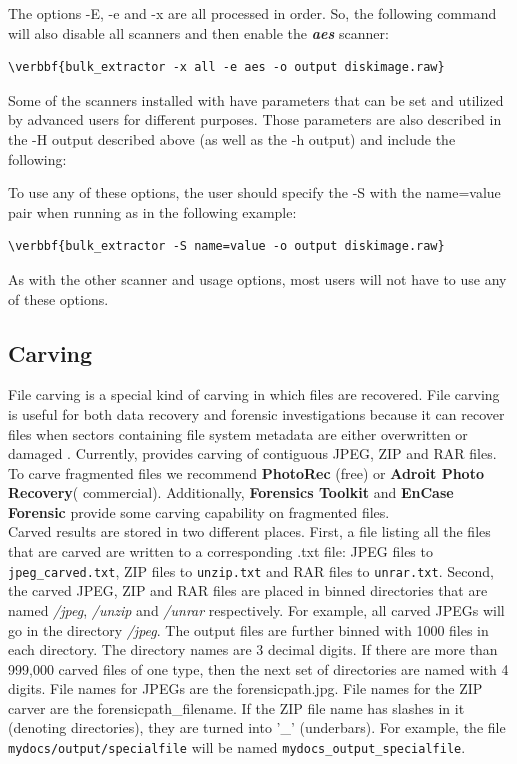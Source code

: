 \documentclass[11pt]{article} %
\begin{document}
The options -E, -e and -x are all processed in order. So, the following command will also disable all scanners and then enable the \textbf{\textit{aes}} scanner: 
\begin{Verbatim}[commandchars=\\\{\}]
\verbbf{bulk_extractor -x all -e aes -o output diskimage.raw}
\end{Verbatim} 

Some of the scanners installed with \bulk have parameters that can be set and utilized by advanced users for different purposes. Those parameters are also described in the -H output described above (as well as the -h output) and include the following:
\begingroup
\footnotesize
{
\selectfont

}
\endgroup

To use any of these options, the user should specify the -S with the name=value pair when running \bulk as in the following example:
\begin{Verbatim}[commandchars=\\\{\}]
\verbbf{bulk_extractor -S name=value -o output diskimage.raw}
\end{Verbatim} 
As with the other scanner and \bulk usage options, most users will not have to use any of these options. 

\subsection{Carving}
\label{carving}

File carving is a special kind of carving in which files are recovered. File carving is useful for both data recovery and forensic investigations because it can recover files when sectors containing file system metadata are either overwritten or damaged \cite{digitalmediatriage}. Currently, \bulk provides carving of contiguous JPEG, ZIP and RAR files. To carve fragmented files we recommend \textbf{PhotoRec} (free) or \textbf{Adroit Photo Recovery}( commercial). Additionally, \textbf{Forensics Toolkit} and \textbf{EnCase Forensic} provide some carving capability on fragmented files.\\

Carved results are stored in two different places. First, a file listing all the files that are carved are written to a corresponding .txt file: JPEG files to \texttt{jpeg\_carved.txt}, ZIP files to \texttt{unzip.txt} and RAR files to \texttt{unrar.txt}. Second, the carved JPEG, ZIP and RAR files are placed in binned directories that are named \textit{/jpeg}, \textit{/unzip} and \textit{/unrar} respectively. For example, all carved JPEGs will go in the directory \textit{/jpeg}. The output files are further binned with 1000 files in each directory. The directory names are 3 decimal digits. If there are more than 999,000 carved files of one type, then the next set of directories are named with 4 digits. File names for JPEGs are the forensicpath.jpg. File names for the ZIP carver are the forensicpath\_filename. If the ZIP file name has slashes in it (denoting directories), they are turned into '\_' (underbars). For example, the file \texttt{mydocs/output/specialfile} will be named \texttt{mydocs\_output\_specialfile}. \\
\end{document}

